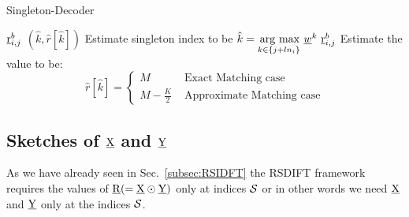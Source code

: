 \begin{enumerate}
\begin{algorithm}[h!]
\caption{Singleton-Decoder}
\label{Algo:SingletonDecoder}
\begin{algorithmic}
 $\underline{\mathrm{r}}^b_{i,j}$
\vspace{\gap}
 $(\hat{k},\hat{r}[\hat{k}])$
\vspace{\gap}
\State Estimate singleton index to be $ \hat{k} = \underset{k\in\{j+l n_i\}}{\operatorname*{\,arg\ max}}\  \underline{w}^{k} ~ \underline{\mathrm{r}}^{b}_{i,j}$
\vspace{\gap}
  \State Estimate the value to be:$$ \hat{r}[\hat{k}]=
   \begin{cases}
   M & \text{ Exact Matching case}\\
  M-\frac{K}{2} & \text{ Approximate Matching case}
  \end{cases}
  $$
\end{algorithmic}
\end{algorithm}

\subsection{Sketches of $\underline{\mathrm{X}}$ and $\underline{\mathrm{Y}}$} 
\label{subsec:skteches}		 
 As we have already seen in Sec.~\ref{subsec:RSIDFT} the RSDIFT framework requires the values of $\underline{\mathrm{R}}(=\underline{\mathrm{X}}\odot \underline{\mathrm{Y}})$ only at indices $\mathcal{S}$ or in other words we need $\underline{\mathrm{X}}$ and $\underline{\mathrm{Y}}$ only at the indices $\mathcal{S}$. \\
% 


\end{enumerate}
